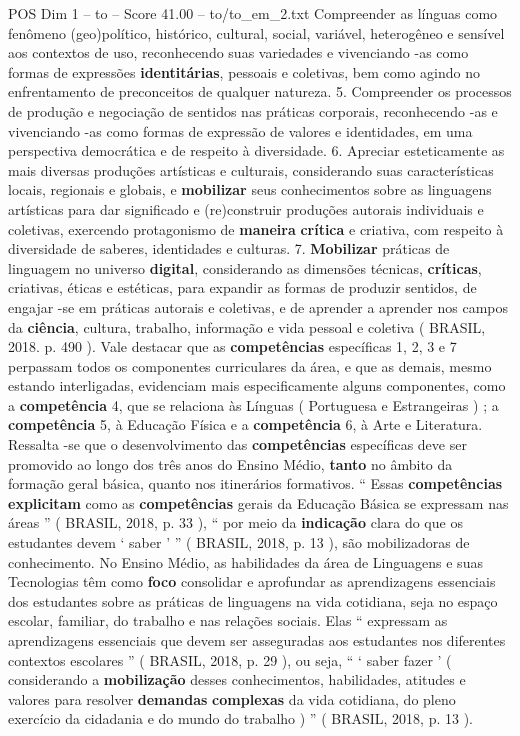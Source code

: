 \begin{textsample}{POS Dim 1 – to – Score 41.00 – to/to\_em\_2.txt}
Compreender as línguas como fenômeno (geo)político, histórico, cultural, social, variável, heterogêneo e sensível aos contextos de uso, reconhecendo suas variedades e vivenciando -as como formas de expressões \textbf{identitárias}, pessoais e coletivas, bem como agindo no enfrentamento de preconceitos de qualquer natureza. 5.
Compreender os processos de produção e negociação de sentidos nas práticas corporais, reconhecendo -as e vivenciando -as como formas de expressão de valores e identidades, em uma perspectiva democrática e de respeito à diversidade. 6.
Apreciar esteticamente as mais diversas produções artísticas e culturais, considerando suas características locais, regionais e globais, e \textbf{mobilizar} seus conhecimentos sobre as linguagens artísticas para dar significado e (re)construir produções autorais individuais e coletivas, exercendo protagonismo de \textbf{maneira} \textbf{crítica} e criativa, com respeito à diversidade de saberes, identidades e culturas. 7. \textbf{Mobilizar} práticas de linguagem no universo \textbf{digital}, considerando as dimensões técnicas, \textbf{críticas}, criativas, éticas e estéticas, para expandir as formas de produzir sentidos, de engajar -se em práticas autorais e coletivas, e de aprender a aprender nos campos da \textbf{ciência}, cultura, trabalho, informação e vida pessoal e coletiva ( BRASIL, 2018. p. 490 ).
Vale destacar que as \textbf{competências} específicas 1, 2, 3 e 7 perpassam todos os componentes curriculares da área, e que as demais, mesmo estando interligadas, evidenciam mais especificamente alguns componentes, como a \textbf{competência} 4, que se relaciona às Línguas ( Portuguesa e Estrangeiras ) ; a \textbf{competência} 5, à Educação Física e a \textbf{competência} 6, à Arte e Literatura.
Ressalta -se que o desenvolvimento das \textbf{competências} específicas deve ser promovido ao longo dos três anos do Ensino Médio, \textbf{tanto} no âmbito da formação geral básica, quanto nos itinerários formativos. “ Essas \textbf{competências} \textbf{explicitam} como as \textbf{competências} gerais da Educação Básica se expressam nas áreas ” ( BRASIL, 2018, p. 33 ), “ por meio da \textbf{indicação} clara do que os estudantes devem ‘ saber ’ ” ( BRASIL, 2018, p. 13 ), são mobilizadoras de conhecimento.
No Ensino Médio, as habilidades da área de Linguagens e suas Tecnologias têm como \textbf{foco} consolidar e aprofundar as aprendizagens essenciais dos estudantes sobre as práticas de linguagens na vida cotidiana, seja no espaço escolar, familiar, do trabalho e nas relações sociais.
Elas “ expressam as aprendizagens essenciais que devem ser asseguradas aos estudantes nos diferentes contextos escolares ” ( BRASIL, 2018, p. 29 ), ou seja, “ ‘ saber fazer ’ ( considerando a \textbf{mobilização} desses conhecimentos, habilidades, atitudes e valores para resolver \textbf{demandas} \textbf{complexas} da vida cotidiana, do pleno exercício da cidadania e do mundo do trabalho ) ” ( BRASIL, 2018, p. 13 ).

\end{textsample}
